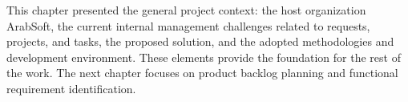 \vspace{12pt}


{\fontsize{12}{18}\selectfont
\setlength{\parindent}{1.2cm}
\setlength{\parskip}{6pt}

\indent This chapter presented the general project context: the host organization ArabSoft, the current internal management challenges related to requests, projects, and tasks, the proposed solution, and the adopted methodologies and development environment. These elements provide the foundation for the rest of the work. The next chapter focuses on product backlog planning and functional requirement identification.

}

